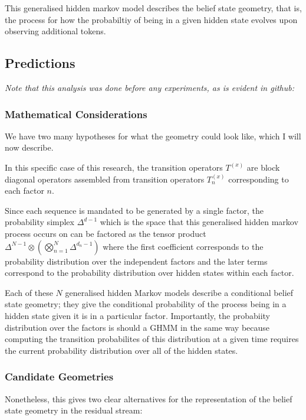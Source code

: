 \documentclass[11pt,a4paper]{article}
\begin{document}
This generalised hidden markov model describes the belief state geometry, that is, the process for how the probabiltiy of being in a given hidden state evolves upon observing additional tokens.





\subsection*{Predictions}

\textit{Note that this analysis was done before any experiments, as is evident in github:}

\subsubsection*{Mathematical Considerations}
We have two many hypotheses for what the geometry could look like, which I will now describe.

In this specific case of this research, the transition operators $T^{(x)}$ are block diagonal operators assembled from transition operators $T_n^{(x)}$ corresponding to each factor $n$. 

Since each sequence is mandated to be generated by a single factor, the probability simplex $\Delta^{d-1}$ which is the space that this generalised hidden markov process occurs on can be factored as the tensor product $\Delta^{N-1}\otimes \left(\bigotimes_{n=1}^N\Delta^{d_n-1}\right)$ where the first coefficient corresponds to the probability distribution over the independent factors and the later terms correspond to the probability distribution over hidden states within each factor.

Each of these $N$ generalised hidden Markov models describe a conditional belief state geometry; they give the conditional probability of the process being in a hidden state given it is in a particular factor. Importantly, the probabiity distribution over the factors is should a GHMM in the same way because computing the transition probabilites of this distribution at a given time requires the current probability distribution over all of the hidden states.


\subsubsection*{Candidate Geometries}

Nonetheless, this gives two clear alternatives for the representation of the belief state geometry in the residual stream:
\end{document}
